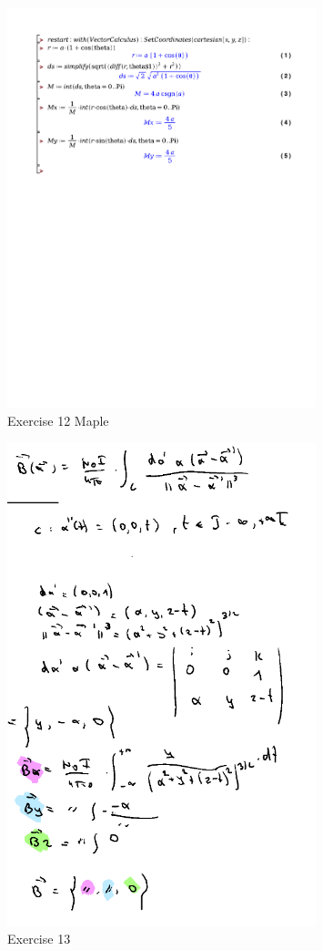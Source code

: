 \documentclass[a4paper]{report}
\begin{document}
\begin{figure}[H]
	\centering
	\includegraphics[width=0.8\textwidth]{exercises/huis_6_ex_12.pdf}
	\caption{Exercise 12 Maple}
	\label{fig:huis_6_ex_12_maple}
\end{figure}


\begin{figure}[H]
	\centering
	\includegraphics[width=0.8\textwidth]{assets/huis_6_ex_13.png}
	\caption{Exercise 13}
	\label{fig:huis_6_ex_13}
\end{figure}
\end{document}
